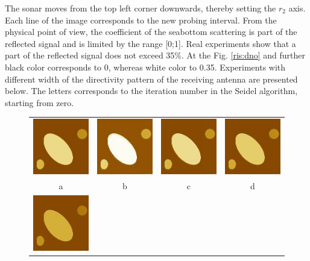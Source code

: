 \documentclass{procDDs}
\begin{document}



The sonar moves from the top left corner downwards, thereby setting the $ r_2 $ axis. Each line of the image corresponds to the new probing interval. From the physical point of view, the coefficient of the seabottom scattering is part of the reflected signal and is limited by the range [0;1]. Real experiments show that a part of the reflected signal does not exceed 35\%. At the Fig. \ref{ris:dno} and further black color corresponds to 0, whereas white color to 0.35. Experiments with different width of the directivity pattern of the receiving antenna are presented below. The letters corresponds to the iteration number in the Seidel algorithm, starting from zero.

\begin{figure}[h!]\center%
	\begin{tabular}{cccc}
		\includegraphics[width=0.2\linewidth]{k-img-5-1.jpg}&
		\includegraphics[width=0.2\linewidth]{k-img-5-3.jpg}&
		\includegraphics[width=0.2\linewidth]{k-img-5-4.jpg}&
		\includegraphics[width=0.2\linewidth]{k-img-5-5.jpg}\\
		a & b & c & d \\
		\includegraphics[width=0.2\linewidth]{k-img-5-6.jpg}&

\end{tabular}
\end{figure}
\end{document}
